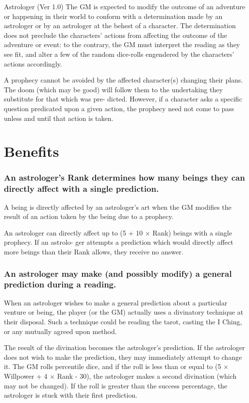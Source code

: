 \begin{Chapter}{Astrologer (Ver 1.0)}
The GM is expected to modify the outcome of an adventure or happening
in their world to conform with a determination made by an astrologer
or by an astrologer at the behest of a character.  The determination
does not preclude the characters’ actions from affecting the outcome
of the adventure or event: to the contrary, the GM must interpret the
reading as they see fit, and alter a few of the random dice-rolls
engendered by the characters’ actions accordingly.

A prophecy cannot be avoided by the affected character(s) changing
their plans.  The doom (which may be good) will follow them to the
undertaking they substitute for that which was pre- dicted.  However,
if a character asks a specific question predicated upon a given
action, the prophecy need not come to pass unless and until that
action is taken.

\section{Benefits}

\subsubsection{An astrologer’s Rank determines how many beings they can directly
affect with a single prediction.}

A being is directly affected by an astrologer’s art when the GM
modifies the result of an action taken by the being due to a prophecy.

An astrologer can directly affect up to (5 + 10 × Rank) beings with a
single prophecy. If an astrolo- ger attempts a prediction which would
directly affect more beings than their Rank allows, they receive no
answer.

\subsubsection{An astrologer may make (and possibly modify) a general prediction
during a reading.}

When an astrologer wishes to make a general prediction about a
particular venture or being, the player (or the GM) actually uses a
divinatory technique at their disposal.  Such a technique could be
reading the tarot, casting the I Ching, or any mutually agreed upon
method.

The result of the divination becomes the astrologer’s prediction.  If
the astrologer does not wish to make the prediction, they may
immediately attempt to change it.  The GM rolls percentile dice, and
if the roll is less than or equal to (5 × Willpower + 4 × Rank - 30),
the astrologer makes a second divination (which may not be changed).
If the roll is greater than the success percentage, the astrologer is
stuck with their first prediction.


\end{Chapter}
